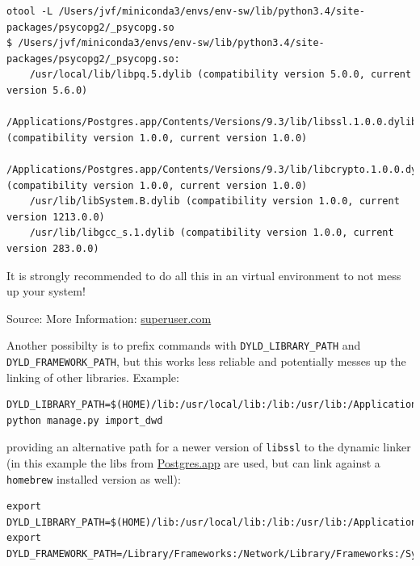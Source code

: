 \documentclass[paper=a4, fontsize=11pt]{scrartcl} %
\numberwithin{equation}{section} %
\numberwithin{figure}{section} %
\numberwithin{table}{section} %
\begin{document}
\begin{lstlisting}[breaklines=true]
otool -L /Users/jvf/miniconda3/envs/env-sw/lib/python3.4/site-packages/psycopg2/_psycopg.so                                                                                                                                                   
$ /Users/jvf/miniconda3/envs/env-sw/lib/python3.4/site-packages/psycopg2/_psycopg.so:
    /usr/local/lib/libpq.5.dylib (compatibility version 5.0.0, current version 5.6.0)
    /Applications/Postgres.app/Contents/Versions/9.3/lib/libssl.1.0.0.dylib (compatibility version 1.0.0, current version 1.0.0)
    /Applications/Postgres.app/Contents/Versions/9.3/lib/libcrypto.1.0.0.dylib (compatibility version 1.0.0, current version 1.0.0)
    /usr/lib/libSystem.B.dylib (compatibility version 1.0.0, current version 1213.0.0)
    /usr/lib/libgcc_s.1.dylib (compatibility version 1.0.0, current version 283.0.0)
\end{lstlisting}

It is strongly recommended to do all this in an virtual environment to
not mess up your system!

Source: More Information:
\href{http://superuser.com/a/721564}{superuser.com}

Another possibilty is to prefix commands with
\texttt{DYLD\_LIBRARY\_PATH} and \texttt{DYLD\_FRAMEWORK\_PATH}, but
this works less reliable and potentially messes up the linking of other
libraries. Example:

\begin{lstlisting}[breaklines=true]
DYLD_LIBRARY_PATH=$(HOME)/lib:/usr/local/lib:/lib:/usr/lib:/Applications/Postgres.app/Contents/Versions/9.3/lib,DYLD_FRAMEWORK_PATH=/Library/Frameworks:/Network/Library/Frameworks:/System/Library/Frameworks python manage.py import_dwd
\end{lstlisting}

providing an alternative path for a newer version of \texttt{libssl} to
the dynamic linker (in this example the libs from
\href{http://postgresapp.com}{Postgres.app} are used, but can link
against a \texttt{homebrew} installed version as well):

\begin{lstlisting}[breaklines=true]
export DYLD_LIBRARY_PATH=$(HOME)/lib:/usr/local/lib:/lib:/usr/lib:/Applications/Postgres.app/Contents/Versions/9.3/lib
export DYLD_FRAMEWORK_PATH=/Library/Frameworks:/Network/Library/Frameworks:/System/Library/Frameworks
\end{lstlisting}
\end{document}
